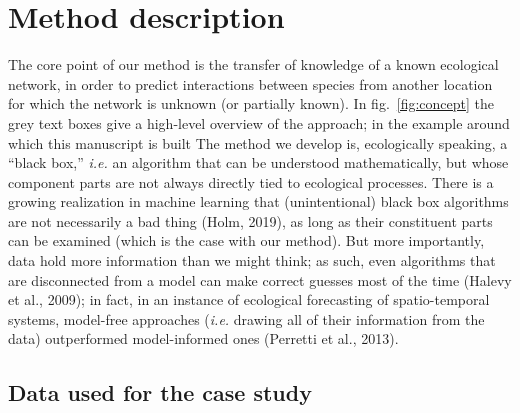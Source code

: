 \documentclass[10pt,oneside]{article}
\begin{document}
\hypertarget{method-description}{%
\section{Method description}\label{method-description}}

The core point of our method is the transfer of knowledge of a known
ecological network, in order to predict interactions between species
from another location for which the network is unknown (or partially
known). In fig.~\ref{fig:concept} the grey text boxes give a high-level
overview of the approach; in the example around which this manuscript is
built The method we develop is, ecologically speaking, a ``black box,''
\emph{i.e.} an algorithm that can be understood mathematically, but
whose component parts are not always directly tied to ecological
processes. There is a growing realization in machine learning that
(unintentional) black box algorithms are not necessarily a bad thing
(Holm, 2019), as long as their constituent parts can be examined (which
is the case with our method). But more importantly, data hold more
information than we might think; as such, even algorithms that are
disconnected from a model can make correct guesses most of the time
(Halevy et al., 2009); in fact, in an instance of ecological forecasting
of spatio-temporal systems, model-free approaches (\emph{i.e.} drawing
all of their information from the data) outperformed model-informed ones
(Perretti et al., 2013).

\hypertarget{data-used-for-the-case-study}{%
\subsection{Data used for the case
study}\label{data-used-for-the-case-study}}
\end{document}
